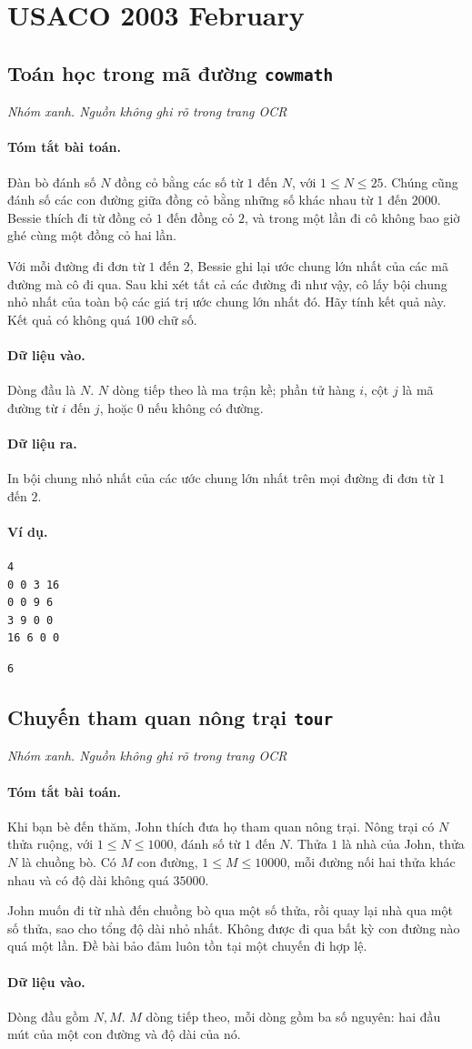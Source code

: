 \documentclass[11pt]{article}
\newcommand{\problem}[4]{%
  \subsection[#1 (#2)]{#1 \hfill {\normalsize\texttt{#2}}}%
  \noindent\textit{#3. #4}\par\smallskip
}
\newcommand{\iosec}[1]{\paragraph{#1}}
\begin{document}
\section{USACO 2003 February}

\problem{Toán học trong mã đường}{cowmath}{Nhóm xanh}{Nguồn không ghi rõ trong trang OCR}

\iosec{Tóm tắt bài toán.}
Đàn bò đánh số \(N\) đồng cỏ bằng các số từ \(1\) đến \(N\), với
\(1\le N\le 25\). Chúng cũng đánh số các con đường giữa đồng cỏ bằng những số
khác nhau từ \(1\) đến \(2000\). Bessie thích đi từ đồng cỏ \(1\) đến đồng cỏ
\(2\), và trong một lần đi cô không bao giờ ghé cùng một đồng cỏ hai lần.

Với mỗi đường đi đơn từ \(1\) đến \(2\), Bessie ghi lại ước chung lớn nhất của
các mã đường mà cô đi qua. Sau khi xét tất cả các đường đi như vậy, cô lấy bội
chung nhỏ nhất của toàn bộ các giá trị ước chung lớn nhất đó. Hãy tính kết quả
này. Kết quả có không quá \(100\) chữ số.

\iosec{Dữ liệu vào.}
Dòng đầu là \(N\). \(N\) dòng tiếp theo là ma trận kề; phần tử hàng \(i\), cột
\(j\) là mã đường từ \(i\) đến \(j\), hoặc \(0\) nếu không có đường.

\iosec{Dữ liệu ra.}
In bội chung nhỏ nhất của các ước chung lớn nhất trên mọi đường đi đơn từ
\(1\) đến \(2\).

\iosec{Ví dụ.}
\begin{verbatim}
4
0 0 3 16
0 0 9 6
3 9 0 0
16 6 0 0
\end{verbatim}

\begin{verbatim}
6
\end{verbatim}

\problem{Chuyến tham quan nông trại}{tour}{Nhóm xanh}{Nguồn không ghi rõ trong trang OCR}

\iosec{Tóm tắt bài toán.}
Khi bạn bè đến thăm, John thích đưa họ tham quan nông trại. Nông trại có
\(N\) thửa ruộng, với \(1\le N\le 1000\), đánh số từ \(1\) đến \(N\). Thửa
\(1\) là nhà của John, thửa \(N\) là chuồng bò. Có \(M\) con đường,
\(1\le M\le 10000\), mỗi đường nối hai thửa khác nhau và có độ dài không quá
\(35000\).

John muốn đi từ nhà đến chuồng bò qua một số thửa, rồi quay lại nhà qua một số
thửa, sao cho tổng độ dài nhỏ nhất. Không được đi qua bất kỳ con đường nào quá
một lần. Đề bài bảo đảm luôn tồn tại một chuyến đi hợp lệ.

\iosec{Dữ liệu vào.}
Dòng đầu gồm \(N,M\). \(M\) dòng tiếp theo, mỗi dòng gồm ba số nguyên: hai đầu
mút của một con đường và độ dài của nó.
\end{document}
